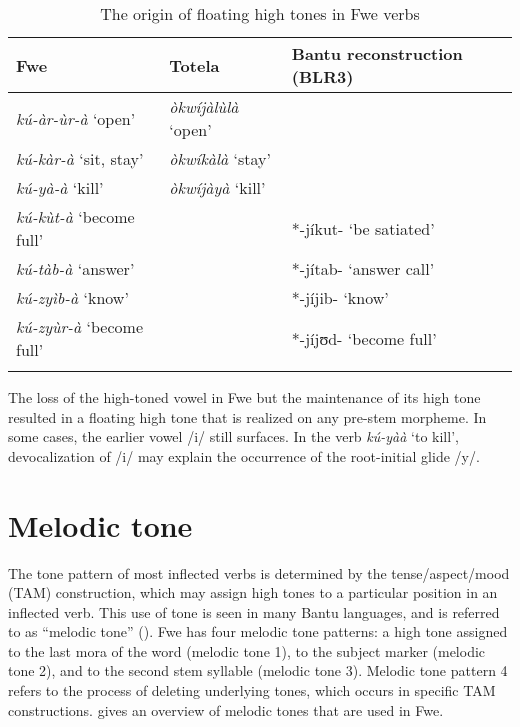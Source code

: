 \begin{table}
\label{bkm:Ref98935090}\caption{\label{tab:3:4}The origin of floating high tones in Fwe verbs}

\begin{tabularx}{\textwidth}{Xll}
\lsptoprule
Fwe & Totela \citep{Crane2011} & Bantu reconstruction (BLR3)\\
\midrule
\textit{kú-àr-ùr-à} ‘open’ & \textit{òkwíjàlùlà} ‘open’ & \\
\textit{kú-kàr-à} ‘sit, stay’ & \textit{òkwíkàlà} ‘stay’ & \\
\textit{kú-yà-à} ‘kill’ & \textit{òkwíjàyà} ‘kill’ & \\
\textit{kú-kùt-à} ‘become full’ &  & *-jíkut- ‘be satiated’\\
\textit{kú-tàb-à} ‘answer’ &  & *-jítab- ‘answer call’\\
\textit{kú-zyìb-à} ‘know’ &  & *-jíjib- ‘know’\\
\textit{kú-zyùr-à} ‘become full’ &  & *-jíjʊd- ‘become full’\\
\lspbottomrule
\end{tabularx}
\end{table}

The loss of the high-toned vowel in Fwe but the maintenance of its high tone resulted in a float\-ing high tone that is realized on any pre-stem morpheme. In some cases, the earlier vowel /i/ still surfaces. In the verb \textit{kú-yàà} ‘to kill’, devocalization of /i/ may explain the occurrence of the root-initial glide /y/.

\section{Melodic tone}
\label{bkm:Ref71539267}\hypertarget{Toc75352628}{}
The tone pattern of most inflected verbs is determined by the tense/aspect/mood (TAM) construction, which may assign high tones to a particular position in an inflected verb. This use of tone is seen in many Bantu languages, and is referred to as “melodic tone” (\citealt{OddenBickmore2014}). Fwe has four melodic tone patterns: a high tone assigned to the last mora of the word (melodic tone 1), to the subject marker (melodic tone 2), and to the second stem syllable (melodic tone 3). Melodic tone pattern 4 refers to the process of deleting underlying tones, which occurs in specific TAM constructions.  gives an overview of melodic tones that are used in Fwe.

